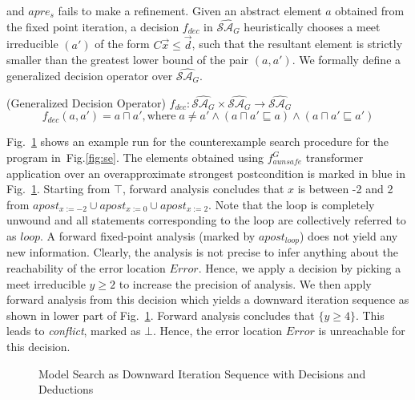 and $apre_{s}$ fails to make a refinement.  Given an abstract element 
$a$ obtained from the fixed point iteration, a decision $f_{dec}$ in 
$\widehat{\mathcal{SA}_{G}}$ heuristically chooses a meet 
irreducible $(a')$ of the form $C\vec{x} \leq \vec{d}$, such that
the resultant element is strictly smaller than the greatest 
lower bound of the pair $(a, a')$.  We formally define a generalized decision operator 
over $\widehat{\mathcal{SA}_{G}}$. 
%
\begin{definition} (Generalized Decision Operator) 
  $f_{dec} \colon \widehat{\mathcal{SA}_{G}} \times \widehat{\mathcal{SA}_{G}}
  \rightarrow \widehat{\mathcal{SA}_{G}}$  
   \[ f_{dec}(a, a') = 
        a \sqcap a', \text{where}\; a\neq a' \wedge (a \sqcap a' \sqsubseteq a)
        \wedge (a \sqcap a' \sqsubseteq a')
   \]     
\end{definition}
%
\begin{example}
%
Fig.~\ref{model-search} shows an example run for the counterexample search procedure 
for the program in~Fig.\ref{fig:se}.  The elements obtained using $f_{aunsafe}^{G}$ 
transformer application over an overapproximate strongest postcondition is marked 
in blue in Fig.~\ref{model-search}.  
Starting from $\top$, forward analysis concludes that $x$ is between -2 and 2
from $apost_{x:=-2} \cup apost_{x:=0} \cup apost_{x:=2}$.  Note that the loop is completely 
unwound and all statements corresponding to the loop are collectively referred to as $loop$. 
A forward fixed-point analysis (marked by $apost_{loop}$) does not yield any new 
information. Clearly, the analysis
is not precise to infer anything about the reachability of the error location $Error$. 
Hence, we apply a decision by picking a meet irreducible $y\geq 2$ to increase the 
precision of analysis.  We then apply forward analysis from this decision which
yields a downward iteration sequence as shown in lower part of
Fig.~\ref{model-search}.  Forward analysis concludes that $\{y \geq 4\}$.
This leads to \emph{conflict}, marked as $\bot$. Hence, the error location
$Error$ is unreachable for this decision. 
\end{example}
%
\begin{figure}[t]
\centering
\vspace*{-0.2cm}
  \caption{Model Search as Downward Iteration Sequence with Decisions and
  Deductions}
\label{model-search}
\end{figure}
%
%
